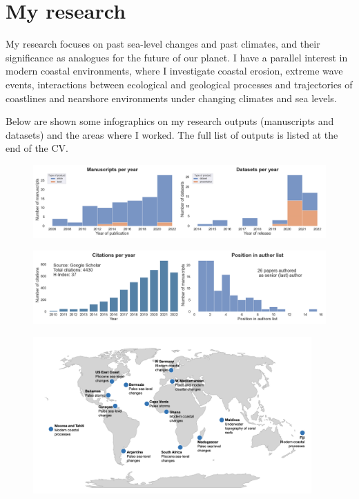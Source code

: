 \documentclass[%
               doublesided,
               paper=a4,
               fontsize=10pt
              ]{my-resume}
\begin{document}
\pagestyle{empty}

\section[\faAreaChart]{My research}
\pubforcefullwidth
My research focuses on past sea-level changes and past climates, and their significance as  analogues for the future of our planet. ​I have a parallel interest in modern coastal environments, where I investigate coastal erosion, extreme wave events, interactions between ecological and geological processes and trajectories of coastlines and nearshore environments under changing climates and sea levels. 

\medskip

Below are shown some infographics on my research outputs (manuscripts and datasets) and the areas where I worked. The full list of outputs is listed at the end of the CV.
\medskip

\begin{figure}[h]
\centering
\includegraphics[width=\textwidth]{img/products_per_year.png}
\end{figure}

\begin{figure}[h]
\centering
\includegraphics[width=\textwidth]{img/citations_authors.png} 
\end{figure}

\begin{figure}[h]
\centering
\includegraphics[width=0.95\textwidth]{img/field_data.png} 
\end{figure}
\end{document}
